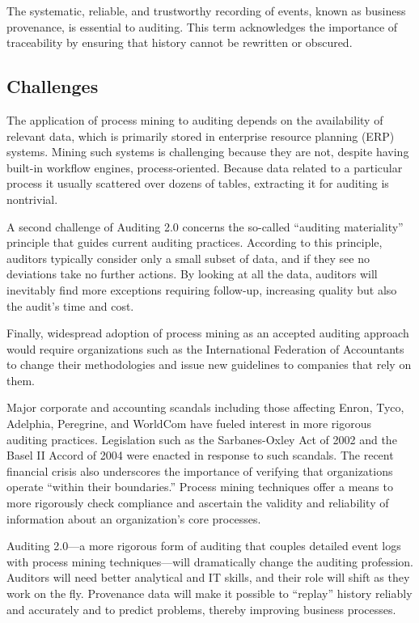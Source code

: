 The systematic, reliable, and trustworthy recording of events, known as business provenance, is essential to auditing. This term acknowledges the importance of traceability by ensuring that history cannot be rewritten or obscured.

\subsection{Challenges}

The application of process mining to auditing depends on the availability of relevant data, which is primarily stored in enterprise resource planning (ERP) systems. Mining such systems is challenging because they are not, despite having built-in workflow engines, process-oriented. Because data related to a particular process it usually scattered over dozens of tables, extracting it for auditing is nontrivial. %

A second challenge of Auditing 2.0 concerns the so-called “auditing materiality” principle that guides current auditing practices. According to this principle, auditors typically consider only a small subset of data, and if they see no deviations take no further actions. By looking at all the data, auditors will inevitably find more exceptions requiring follow-up, increasing quality but also the audit's time and cost.

Finally, widespread adoption of process mining as an accepted auditing approach would require organizations such as the International Federation of Accountants to change their methodologies and issue new guidelines to companies that rely on them.

Major corporate and accounting scandals including those affecting Enron, Tyco, Adelphia, Peregrine, and WorldCom have fueled interest in more rigorous auditing practices. Legislation such as the Sarbanes-Oxley Act of 2002 and the Basel II Accord of 2004 were enacted in response to such scandals. The recent financial crisis also underscores the importance of verifying that organizations operate “within their boundaries.” Process mining techniques offer a means to more rigorously check compliance and ascertain the validity and reliability of information about an organization's core processes.

Auditing 2.0—a more rigorous form of auditing that couples detailed event logs with process mining techniques—will dramatically change the auditing profession. Auditors will need better analytical and IT skills, and their role will shift as they work on the fly. Provenance data will make it possible to “replay” history reliably and accurately and to predict problems, thereby improving business processes.
